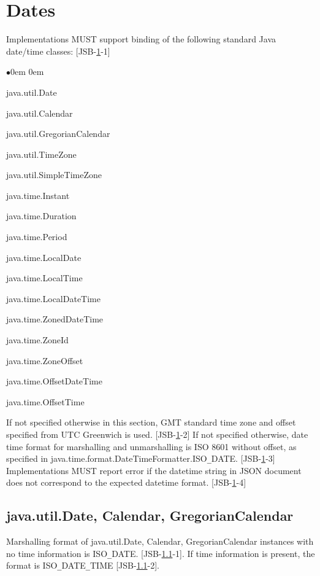 \section{Dates}
\label{sec:dates}
Implementations MUST support binding of the following standard Java date/time classes: 
[JSB-\ref{sec:dates}-1]
\begin{list}{$\bullet$}{\parsep 0em  0em}
\item java.util.Date
\item java.util.Calendar
\item java.util.GregorianCalendar
\item java.util.TimeZone
\item java.util.SimpleTimeZone
\item java.time.Instant
\item java.time.Duration
\item java.time.Period
\item java.time.LocalDate
\item java.time.LocalTime
\item java.time.LocalDateTime
\item java.time.ZonedDateTime
\item java.time.ZoneId
\item java.time.ZoneOffset
\item java.time.OffsetDateTime
\item java.time.OffsetTime
\end{list}

If not specified otherwise in this section, GMT standard time zone and offset specified from UTC Greenwich is used. [JSB-\ref{sec:dates}-2] 
If not specified otherwise, date time format for marshalling and unmarshalling is ISO 8601 without offset, as specified in java.time.format.DateTimeFormatter.ISO\verb|_|DATE. [JSB-\ref{sec:dates}-3] 
Implementations MUST report error if the datetime string in JSON document does not correspond to the expected datetime format. [JSB-\ref{sec:dates}-4]

\subsection{java.util.Date, Calendar, GregorianCalendar}
\label{subsec:datecalendar}
Marshalling format of java.util.Date, Calendar, GregorianCalendar instances with no time information is ISO\verb|_|DATE. [JSB-\ref{subsec:datecalendar}-1]. If time information is present, the format is ISO\verb|_|DATE\verb|_|TIME [JSB-\ref{subsec:datecalendar}-2].

